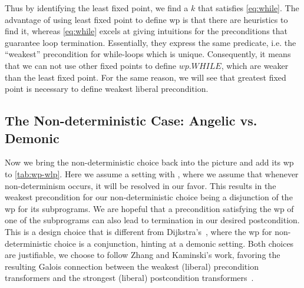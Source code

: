 Thus by identifying the least fixed point, we find a $k$ that satisfies \autoref{eq:while}.
The advantage of using least fixed point to define wp is that there are heuristics to find it, whereas \autoref{eq:while} excels at giving intuitions for the preconditions that guarantee loop termination. 
Essentially, they express the same predicate, i.e. the ``weakest'' precondition for while-loops which is unique. 
Consequently, it means that we can not use other fixed points to define $wp.WHILE$, which are weaker than the least fixed point. 
For the same reason, we will see that greatest fixed point is necessary to define weakest liberal precondition. 


\subsection{The Non-deterministic Case: Angelic vs. Demonic}\label{sec:wp-nondet}
Now we bring the non-deterministic choice back into the picture and add its wp to \autoref{tab:wp-wlp}. 
Here we assume a setting with , where we assume that whenever non-determinism occurs, it will be resolved in our favor.
This results in the weakest precondition for our non-deterministic choice being a disjunction of the wp for its subprograms. 
We are hopeful that a precondition satisfying the wp of one of the subprograms can also lead to termination in our desired postcondition. 
This is a design choice that is different from Dijkstra's~\cite{dijkstra75}, where the wp for non-deterministic choice is a conjunction, hinting at a demonic setting. 
Both choices are justifiable, we choose to follow Zhang and Kaminski's work, favoring the resulting Galois connection between the weakest (liberal) precondition transformers and the strongest (liberal) postcondition transformers~\cite{zhang22}. 


